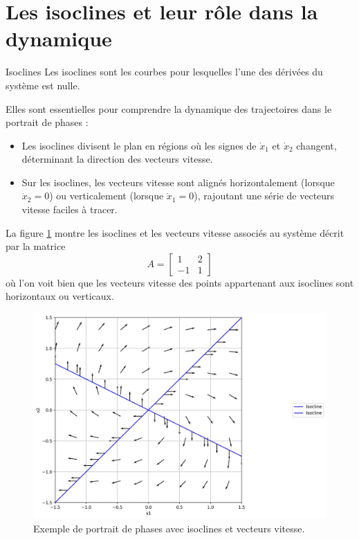     \section{Les isoclines et leur rôle dans la dynamique}
        \begin{definition}{Isoclines}
            Les isoclines sont les courbes pour lesquelles l'une des dérivées du système est nulle.
        \end{definition}
        Elles sont essentielles pour comprendre la dynamique des trajectoires dans le portrait de phases :
        \begin{itemize}
            \item Les isoclines divisent le plan en régions où les signes de $\dot{x}_1$ et $\dot{x}_2$ changent, déterminant la direction des vecteurs vitesse.
            \item Sur les isoclines, les vecteurs vitesse sont alignés horizontalement (lorsque $\dot{x}_2 = 0$) ou verticalement (lorsque $\dot{x}_1 = 0$), rajoutant une série de vecteurs vitesse faciles à tracer.
        \end{itemize}
        La figure \ref{fig:isoclines} montre les isoclines et les vecteurs vitesse associés au système décrit par la matrice
        \begin{equation}
            A = \begin{bmatrix} 1 & 2 \\ -1 & 1 \end{bmatrix}
        \end{equation}
        où l'on voit bien que les vecteurs vitesse des points appartenant aux isoclines sont horizontaux ou verticaux.
        \begin{figure}[ht!]
            \centering
            \includegraphics[width=\textwidth]{images/isoclines.jpg}
            \caption{Exemple de portrait de phases avec isoclines et vecteurs vitesse.}
            \label{fig:isoclines}
        \end{figure}
            

